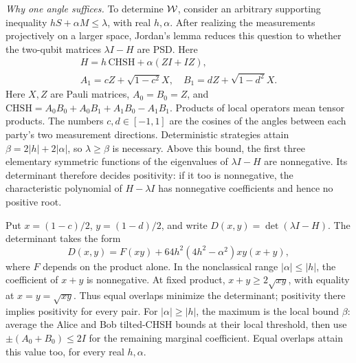\documentclass[11pt,twocolumn]{article}
\begin{document}
\emph{Why one angle suffices.}
To determine $\mathcal W$, consider an arbitrary supporting inequality
$hS+\alpha M\leq\lambda$, with real $h,\alpha$.
After realizing the measurements projectively on a larger space,
Jordan's lemma reduces this question to whether the two-qubit matrices
$\lambda I-H$ are PSD. Here
\[
\begin{gathered}
 H=h\,\mathrm{CHSH}+\alpha(ZI+IZ),\\
 A_1=cZ+\sqrt{1-c^2}X,\quad B_1=dZ+\sqrt{1-d^2}X.
\end{gathered}
\]
Here $X,Z$ are Pauli matrices, $A_0=B_0=Z$, and
$\mathrm{CHSH}=A_0B_0+A_0B_1+A_1B_0-A_1B_1$. Products of local
operators mean tensor products. The numbers $c,d\in[-1,1]$ are
the cosines of the angles between each party's two measurement directions. Deterministic strategies attain
$\beta=2|h|+2|\alpha|$, so $\lambda\geq\beta$ is necessary.
Above this bound, the first three elementary symmetric functions of
the eigenvalues of $\lambda I-H$ are nonnegative. Its determinant
therefore decides positivity: if it too is nonnegative, the characteristic
polynomial of $H-\lambda I$ has nonnegative coefficients and hence
no positive root.

Put $x=(1-c)/2$, $y=(1-d)/2$, and write
$D(x,y)=\det(\lambda I-H)$. The determinant takes the form
\begin{equation}
 D(x,y)=F(xy)+64h^2(4h^2-\alpha^2)xy(x+y),
 \label{eq:key}
\end{equation}
where $F$ depends on the product alone.
In the nonclassical range $|\alpha|\leq|h|$, the coefficient of $x+y$
is nonnegative. At fixed product, $x+y\geq2\sqrt{xy}$, with equality
at $x=y=\sqrt{xy}$. Thus equal overlaps minimize the determinant;
positivity there implies positivity for every pair.
For $|\alpha|\geq|h|$, the maximum is the local bound $\beta$:
average the Alice and Bob tilted-CHSH bounds at their local threshold,
then use $\pm(A_0+B_0)\le2I$ for the remaining marginal coefficient.
Equal overlaps attain this value too, for every real $h,\alpha$.
\end{document}
